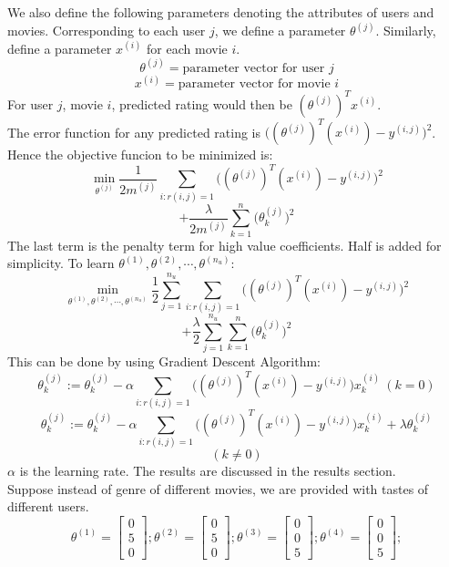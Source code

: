\documentclass[twocolumn]{article}
\begin{document}
We also define the following parameters denoting the attributes of users and movies.
Corresponding to each user $j$, we define a parameter $\theta^{(j)}$. Similarly, define a parameter $x^{(i)}$ for each movie $i$.
$$\theta^{(j)} = \text{parameter vector for user $j$}$$
$$x^{(i)} = \text{parameter vector for movie $i$}$$
For user $j$, movie $i$, predicted rating would then be $(\theta^{(j)})^Tx^{(i)}$.\\
\newline
The error function for any predicted rating is $\Big((\theta^{(j)})^T(x^{(i)})-y^{(i,j)}\Big)^2$. Hence the objective funcion to be minimized is:
$$\min_{\theta^{(j)}} \frac{1}{2m^{(j)}}\displaystyle\sum\limits_{i:r(i,j)=1} \Big((\theta^{(j)})^T(x^{(i)})-y^{(i,j)}\Big)^2$$ $$+ \frac{\lambda}{2m^{(j)}}\displaystyle\sum\limits_{k=1}^{n} \Big(\theta_k^{(j)}\Big)^2$$
The last term is the penalty term for high value coefficients. Half is added for simplicity.
To learn $\theta^{(1)},\theta^{(2)},\cdots,\theta^{(n_u)}$:
$$\min_{\theta^{(1)},\theta^{(2)},\cdots,\theta^{(n_u)}} \frac{1}{2}\displaystyle\sum\limits_{j=1}^{n_u} \displaystyle\sum\limits_{i:r(i,j)=1} \Big((\theta^{(j)})^T(x^{(i)})-y^{(i,j)}\Big)^2$$ $$+ \frac{\lambda}{2}\displaystyle\sum\limits_{j=1}^{n_u} \displaystyle\sum\limits_{k=1}^{n} \Big(\theta_k^{(j)}\Big)^2$$
This can be done by using Gradient Descent Algorithm:
$$\theta_k^{(j)} := \theta_k^{(j)} - \alpha\displaystyle\sum\limits_{i:r(i,j)=1} \Big((\theta^{(j)})^T(x^{(i)})-y^{(i,j)}\Big)x_k^{(i)} \ (k=0)$$
$$\theta_k^{(j)} := \theta_k^{(j)} - \alpha\displaystyle\sum\limits_{i:r(i,j)=1} \Big((\theta^{(j)})^T(x^{(i)})-y^{(i,j)}\Big)x_k^{(i)} + \lambda\theta_k^{(j)}$$ $$(k\neq0)$$
$\alpha$ is the learning rate. The results are discussed in the results section.\\
\newline
Suppose instead of genre of different movies, we are provided with tastes of different users.\\
$$\theta^{(1)}=\begin{bmatrix} 0\\ 5\\ 0 \end{bmatrix}; \theta^{(2)}=\begin{bmatrix} 0\\ 5\\ 0 \end{bmatrix}; \theta^{(3)}=\begin{bmatrix} 0\\ 0\\ 5 \end{bmatrix}; \theta^{(4)}=\begin{bmatrix} 0\\ 0\\ 5 \end{bmatrix};$$
\end{document}
